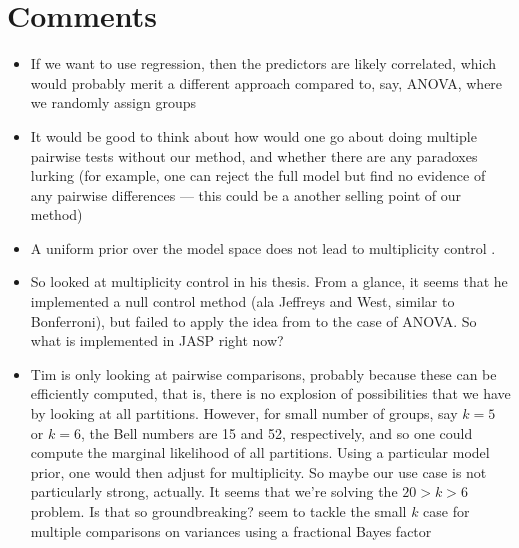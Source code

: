 \documentclass[]{article}
\begin{document}
\section{Comments}
\begin{itemize}
    \item If we want to use regression, then the predictors are likely correlated, which would probably merit a different approach compared to, say, ANOVA, where we randomly assign groups
    \item It would be good to think about how would one go about doing multiple pairwise tests without our method, and whether there are any paradoxes lurking (for example, one can reject the full model but find no evidence of any pairwise differences --- this could be a another selling point of our method)
    \item A uniform prior over the model space does not lead to multiplicity control \parencite{de2019bayesian, scott2010bayes}.
    \item So \textcite{de2019bayesian} looked at multiplicity control in his thesis. From a glance, it seems that he implemented a null control method (ala Jeffreys and West, similar to Bonferroni), but failed to apply the idea from \textcite{scott2006exploration} to the case of ANOVA. So what is implemented in JASP right now?
    \item Tim is only looking at pairwise comparisons, probably because these can be efficiently computed, that is, there is no explosion of possibilities that we have by looking at all partitions. However, for small number of groups, say $k = 5$ or $k = 6$, the Bell numbers are 15 and 52, respectively, and so one could compute the marginal likelihood of all partitions. Using a particular model prior, one would then adjust for multiplicity. So maybe our use case is not particularly strong, actually. It seems that we're solving the $20 > k > 6$ problem. Is that so groundbreaking? \textcite{kang2017objective} seem to tackle the small $k$ case for multiple comparisons on variances using a fractional Bayes factor
\end{itemize}
\end{document}
